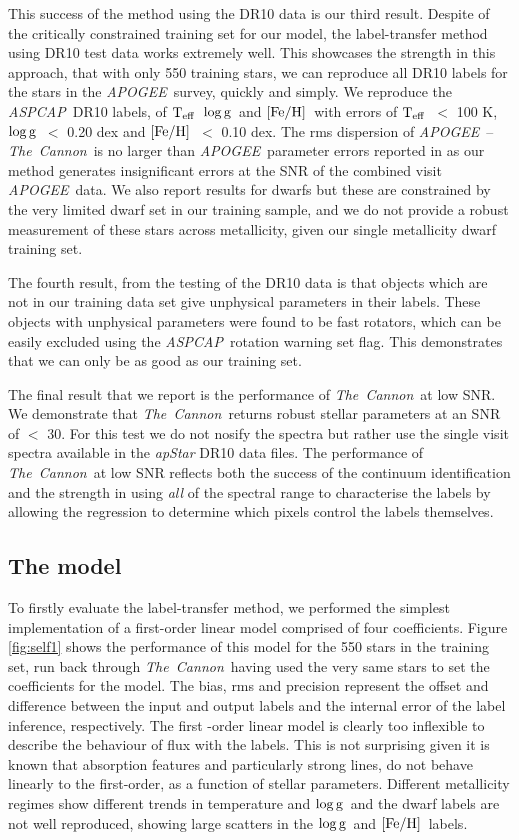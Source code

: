 \documentclass[12pt, preprint]{aastex}
\newcommand{\teff}{\mbox{$\rm T_{eff}$}}
\newcommand{\feh}{\mbox{$\rm [Fe/H]$}}
\newcommand{\logg}{\mbox{$\rm \log g$}}
\newcommand{\tc}{\textsl{The~Cannon}}
\newcommand{\apogee}{\textsl{APOGEE}}
\newcommand{\aspcap}{\textsl{ASPCAP}}
\begin{document}
This success of the method using the DR10 data is our third result.  Despite of the critically constrained training set for our model, the label-transfer method using DR10 test data works extremely well. This showcases the strength in this approach, that with only 550 training stars, we can reproduce all DR10 labels for the stars in the \apogee\ survey, quickly and simply.  
We reproduce the \aspcap\ DR10 labels, of \teff\, \logg\ and \feh\ with errors of \teff\ $<$ 100 K, \logg\ $<$ 0.20 dex and \feh\ $<$ 0.10 dex. The rms dispersion of \apogee\ -- \tc\ is no larger than \apogee\ parameter errors reported in \citep{Meszaros} as our method generates insignificant errors at the SNR of the combined visit \apogee\ data. We also report results for dwarfs but these are constrained by the very limited dwarf set in our training sample, and we do not provide a robust measurement of these stars across metallicity, given our single metallicity dwarf training set.

The fourth result, from the testing of the DR10 data is that objects which are not in our training data set give unphysical parameters in their labels. These objects with unphysical parameters were found to be fast rotators, which can be easily excluded using the \aspcap\ rotation warning set flag. This demonstrates that we can only be as good as our training set. 

The final result that we report is the performance of \tc\ at low SNR. We demonstrate that \tc\ returns robust stellar parameters at an SNR of $<$ 30. For this test we do not nosify the spectra but rather use the single visit spectra available in the \textit{apStar} DR10 data files. The performance of \tc\ at low SNR reflects both the success of the continuum identification and the strength in using \textit{all} of the spectral range to characterise the labels by allowing the regression to determine which pixels control the labels themselves.


\subsection{The model} 

To firstly evaluate the label-transfer method, we performed the simplest implementation of a first-order linear model comprised of four coefficients. Figure \ref{fig:self1} shows the performance of this model for the 550 stars in the training set, run back through \tc\, having used the very same stars to set the coefficients for the model. The bias, rms and precision represent the offset and difference between the input and output labels and the internal error of the label inference, respectively.  The first -order linear model is clearly too inflexible to describe the behaviour of flux with the labels. This is not surprising given it is known that absorption features and particularly strong lines, do not behave linearly to the first-order, as a function of stellar parameters. Different metallicity regimes show different trends in  temperature and \logg\ and the dwarf labels are not well reproduced, showing large scatters in the \logg\ and \feh\ labels. 
\end{document}
